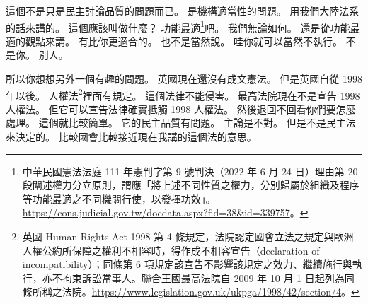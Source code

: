 \hypertarget{w02:cue:2377}{}這個不是只是民主討論品質的問題而已。
\hypertarget{w02:cue:2378}{}是機構適當性的問題。
\hypertarget{w02:cue:2379}{}用我們大陸法系的話來講的。
\hypertarget{w02:cue:2380}{}這個應該叫做什麼？
\hypertarget{w02:cue:2381}{}功能最適\footnote{中華民國憲法法庭 111 年憲判字第 9 號判決（2022 年 6 月 24 日）理由第 20 段闡述權力分立原則，謂應「將上述不同性質之權力，分別歸屬於組織及程序等功能最適之不同機關行使，以發揮功效」。\url{https://cons.judicial.gov.tw/docdata.aspx?fid=38&id=339757}。}吧。
\hypertarget{w02:cue:2382}{}我們無論如何。
\hypertarget{w02:cue:2383}{}還是從功能最適的觀點來講。
\hypertarget{w02:cue:2384}{}有比你更適合的。
\hypertarget{w02:cue:2385}{}也不是當然說。
\hypertarget{w02:cue:2386}{}哇你就可以當然不執行。
\hypertarget{w02:cue:2387}{}不是你。
\hypertarget{w02:cue:2388}{}別人。

\hypertarget{w02:cue:2389}{}所以你想想另外一個有趣的問題。
\hypertarget{w02:cue:2390}{}英國現在還沒有成文憲法。
\hypertarget{w02:cue:2391}{}但是英國自從 1998 年以後。
\hypertarget{w02:cue:2392}{}人權法\footnote{英國 Human Rights Act 1998 第 4 條規定，法院認定國會立法之規定與歐洲人權公約所保障之權利不相容時，得作成不相容宣告（declaration of incompatibility）；同條第 6 項規定該宣告不影響該規定之效力、繼續施行與執行，亦不拘束訴訟當事人。聯合王國最高法院自 2009 年 10 月 1 日起列為同條所稱之法院。\url{https://www.legislation.gov.uk/ukpga/1998/42/section/4}。}裡面有規定。
\hypertarget{w02:cue:2393}{}這個法律不能侵害。
\hypertarget{w02:cue:2394}{}最高法院現在不是宣告 1998 人權法。
\hypertarget{w02:cue:2395}{}但它可以宣告法律確實抵觸 1998 人權法。
\hypertarget{w02:cue:2396}{}然後退回不回看你們要怎麼處理。
\hypertarget{w02:cue:2397}{}這個就比較簡單。
\hypertarget{w02:cue:2398}{}它的民主品質有問題。
\hypertarget{w02:cue:2399}{}主論是不對。
\hypertarget{w02:cue:2400}{}但是不是民主法來決定的。
\hypertarget{w02:cue:2401}{}比較國會比較接近現在我講的這個法的意思。

